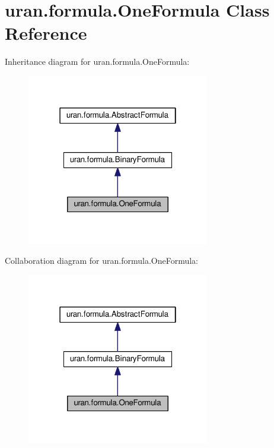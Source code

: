 \hypertarget{classuran_1_1formula_1_1_one_formula}{}\section{uran.\+formula.\+One\+Formula Class Reference}
\label{classuran_1_1formula_1_1_one_formula}


Inheritance diagram for uran.\+formula.\+One\+Formula\+:
\nopagebreak
\begin{figure}[H]
\begin{center}
\leavevmode
\includegraphics[width=226pt]{classuran_1_1formula_1_1_one_formula__inherit__graph}
\end{center}
\end{figure}


Collaboration diagram for uran.\+formula.\+One\+Formula\+:
\nopagebreak
\begin{figure}[H]
\begin{center}
\leavevmode
\includegraphics[width=226pt]{classuran_1_1formula_1_1_one_formula__coll__graph}
\end{center}
\end{figure}
